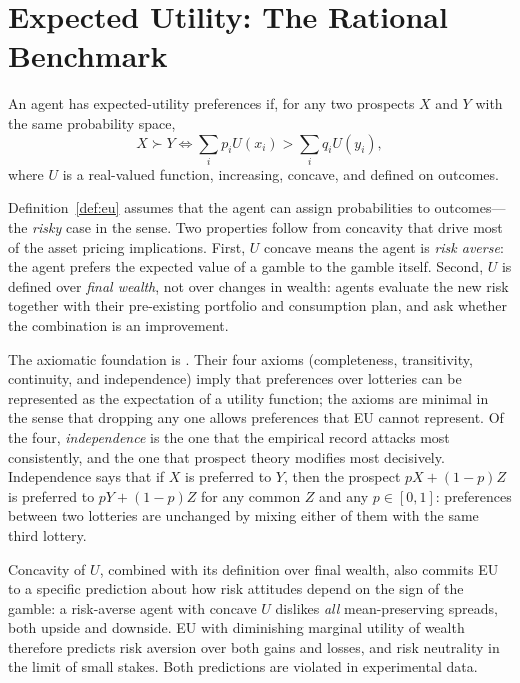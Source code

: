 \section{Expected Utility: The Rational Benchmark}
\label{sec:eu}

\begin{definition}
\label{def:eu}
An agent has expected-utility preferences if, for any two prospects $X$ and $Y$ with the same probability space,
\[
X \succ Y \iff \sum_i p_i U(x_i) > \sum_i q_i U(y_i),
\]
where $U$ is a real-valued function, increasing, concave, and defined on outcomes.
\end{definition}

Definition~\ref{def:eu} assumes that the agent can assign probabilities to outcomes---the \emph{risky} case in the \citet{knight1921} sense. Two properties follow from concavity that drive most of the asset pricing implications. First, $U$ concave means the agent is \emph{risk averse}: the agent prefers the expected value of a gamble to the gamble itself. Second, $U$ is defined over \emph{final wealth}, not over changes in wealth: agents evaluate the new risk together with their pre-existing portfolio and consumption plan, and ask whether the combination is an improvement.

The axiomatic foundation is \citet{vonNeumannMorgenstern1944}. Their four axioms (completeness, transitivity, continuity, and independence) imply that preferences over lotteries can be represented as the expectation of a utility function; the axioms are minimal in the sense that dropping any one allows preferences that EU cannot represent. Of the four, \emph{independence} is the one that the empirical record attacks most consistently, and the one that prospect theory modifies most decisively. Independence says that if $X$ is preferred to $Y$, then the prospect $pX + (1-p)Z$ is preferred to $pY + (1-p)Z$ for any common $Z$ and any $p \in [0,1]$: preferences between two lotteries are unchanged by mixing either of them with the same third lottery.

Concavity of $U$, combined with its definition over final wealth, also commits EU to a specific prediction about how risk attitudes depend on the sign of the gamble: a risk-averse agent with concave $U$ dislikes \emph{all} mean-preserving spreads, both upside and downside. EU with diminishing marginal utility of wealth therefore predicts risk aversion over both gains and losses, and risk neutrality in the limit of small stakes. Both predictions are violated in experimental data.

